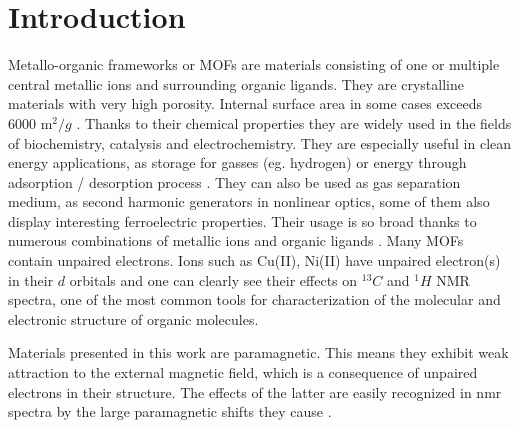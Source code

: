\documentclass[openany, longbibliography,slovene,a4paper,12pt]{article}
\begin{document}



\section{Introduction}

Metallo-organic frameworks or MOFs are materials consisting of one or multiple
central metallic ions and surrounding organic ligands.  They are crystalline
materials with very high porosity. Internal surface area in some cases exceeds
6000 $\mathrm{m}^2/{g}$ \cite{introd_to_metal_organ_frameworks}. Thanks to their
chemical properties they are widely used in the fields of biochemistry,
catalysis and electrochemistry. They are especially useful in clean energy
applications, as storage for gasses (eg. hydrogen) or energy through
adsorption / desorption process \cite{introd_to_metal_organ_frameworks}. They can
also be used as gas separation medium, as second harmonic generators in
nonlinear optics, some of them also display interesting ferroelectric
properties. Their usage is so broad thanks to numerous combinations of metallic
ions and organic ligands  \cite{introd_to_metal_organ_frameworks,
  Assignment_of_Solid_State}. Many MOFs contain unpaired electrons. Ions such as Cu(II), Ni(II) have unpaired electron(s) in their $d$ orbitals and one can clearly see their
 effects on $^{13}C$ and $^{1}H$ NMR  spectra, one of the most common tools for
 characterization of the molecular and electronic structure of organic
 molecules.

 Materials presented in this work are paramagnetic. This means they exhibit weak
 attraction to the external magnetic field, which is a consequence of unpaired
 electrons in their structure. The effects of the latter are easily recognized
 in nmr spectra by the large paramagnetic shifts they cause \cite{Dft_Investigation_of_the_Effect_of_Spin_Orbit}.
\end{document}
